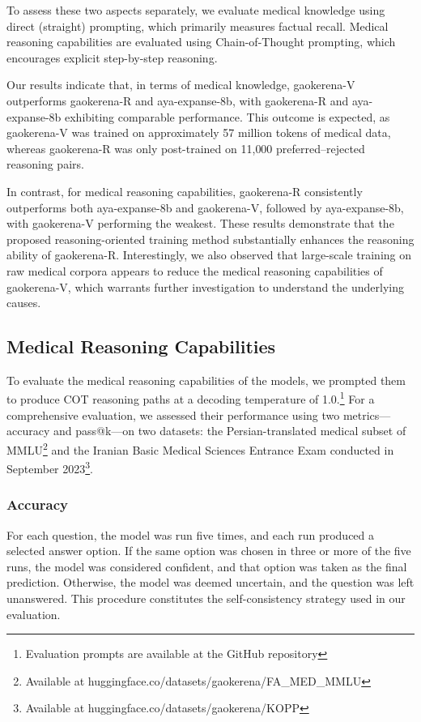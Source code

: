 \documentclass[conference]{IEEEtran}
\begin{document}
To assess these two aspects separately, we evaluate medical knowledge using direct (straight) prompting, which primarily measures factual recall. Medical reasoning capabilities are evaluated using Chain-of-Thought prompting, which encourages explicit step-by-step reasoning.

Our results indicate that, in terms of medical knowledge, gaokerena-V outperforms gaokerena-R and aya-expanse-8b, with gaokerena-R and aya-expanse-8b exhibiting comparable performance. This outcome is expected, as gaokerena-V was trained on approximately 57 million tokens of medical data, whereas gaokerena-R was only post-trained on 11{,}000 preferred–rejected reasoning pairs.

In contrast, for medical reasoning capabilities, gaokerena-R consistently outperforms both aya-expanse-8b and gaokerena-V, followed by aya-expanse-8b, with gaokerena-V performing the weakest. These results demonstrate that the proposed reasoning-oriented training method substantially enhances the reasoning ability of gaokerena-R. Interestingly, we also observed that large-scale training on raw medical corpora appears to reduce the medical reasoning capabilities of gaokerena-V, which warrants further investigation to understand the underlying causes.
          \subsection{Medical Reasoning Capabilities}
To evaluate the medical reasoning capabilities of the models, we prompted them to produce COT reasoning paths at a decoding temperature of 1.0.\footnote{Evaluation prompts are available at the GitHub repository}  
For a comprehensive evaluation, we assessed their performance using two metrics—accuracy and pass@k—on two datasets: the Persian-translated medical subset of MMLU\footnote{Available at huggingface.co/datasets/gaokerena/FA\_MED\_MMLU} and the Iranian Basic Medical Sciences Entrance Exam conducted in September 2023\footnote{Available at huggingface.co/datasets/gaokerena/KOPP}.

              \subsubsection{Accuracy}
For each question, the model was run five times, and each run produced a selected answer option. If the same option was chosen in three or more of the five runs, the model was considered confident, and that option was taken as the final prediction. Otherwise, the model was deemed uncertain, and the question was left unanswered. This procedure constitutes the self-consistency strategy used in our evaluation.
\end{document}
